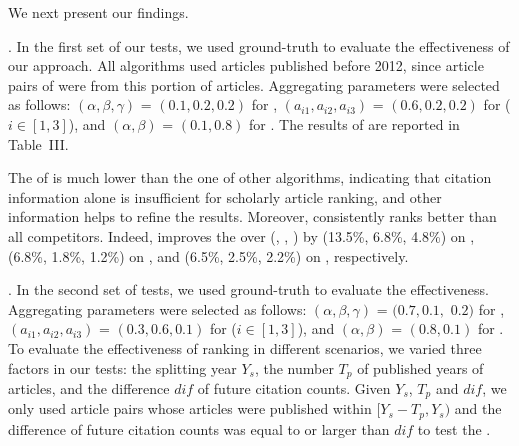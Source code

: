 We next present our findings.

.
In the first set of our tests, we used ground-truth \recom to evaluate the effectiveness of our approach.
All algorithms used articles published before 2012, since article pairs of \recom were from this portion of articles.
Aggregating parameters were selected as follows: $(\alpha,\beta,\gamma)$ = $(0.1, 0.2, 0.2)$ for \futurerank, $(a_{i1},a_{i2},a_{i3})$ = $(0.6, 0.2, 0.2)$ for \hhgrank ($i\in[1,3]$), and $(\alpha,\beta)$ = $(0.1, 0.8)$ for \ensemblerank.
The results of \PairAcc are reported in Table~III.

The \PairAcc of \pagerank is much lower than the one of other algorithms, indicating that citation information alone is insufficient for scholarly article ranking, and other information helps to refine the results. Moreover, \ensemblerank consistently ranks better than all competitors. Indeed, \ensemblerank improves the \PairAcc over (\pagerank, \futurerank, \hhgrank) by (13.5\%, 6.8\%, 4.8\%) on \aan, (6.8\%, 1.8\%, 1.2\%) on \aminer, and (6.5\%, 2.5\%, 2.2\%) on \magdata, respectively.

.
In the second set of tests, we used ground-truth \fcita to evaluate the effectiveness.
Aggregating parameters were selected as follows: $(\alpha, \beta, \gamma)$ = $(0.7, 0.1,$ $0.2)$ for \futurerank, $(a_{i1}, a_{i2}, a_{i3})$ = $(0.3, 0.6, 0.1)$ for \hhgrank ($i\in[1, 3]$), and $(\alpha, \beta)$ = $(0.8, 0.1)$ for \ensemblerank.
To evaluate the effectiveness of ranking in different scenarios, we varied three factors in our tests: the splitting year $Y_s$, the number $T_p$ of published years of articles, and the difference $dif$ of future citation counts.
%
Given $Y_s$, $T_p$ and $dif$, we only used article pairs whose articles were published within $[Y_s - T_p, Y_s)$ and the difference of future citation counts was equal to or larger than $dif$ to test the \PairAcc.



